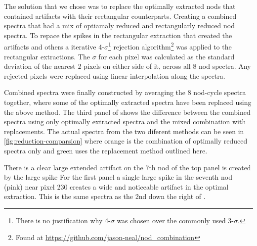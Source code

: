The solution that we chose was to replace the optimally extracted nods that contained artifacts with their rectangular counterparts. Creating a combined spectra that had a mix of optiamaly reduced and rectangularly reduced nod spectra.
To repace the spikes in the rectangular extraction that created the artifacts and others a iterative 4-\(\sigma \)\footnote{There is no justification why 4-\(\sigma\) was chosen over the commonly used 3-\(\sigma\).} rejection algorithm\footnote{Found at \url{https://github.com/jason-neal/nod_combination}} was applied to the rectangular extractions. The \(\sigma\) for each pixel was calculated as the standard deviation of the nearest 2 pixels on either side of it, across all 8 nod spectra. Any rejected pixels were replaced using linear interpolation along the spectra.


Combined spectra were finally constructed by averaging the 8 nod-cycle spectra together, where some of the optimally extracted spectra have been replaced using the above method. The third panel of  shows the difference between the combined spectra using only optimally extracted spectra and the mixed combination with replacements. The actual spectra from the two diferent methods can be seen in \ref{fig:reduction-comparsion} where orange is the combination of optimally reduced spectra only and green uses the replacement method outlined here.

There is a clear large extended artifact on the 7th nod of the top panel is created by the large spike For the first panel a single large spike in the seventh nod (pink) near pixel 230 creates a wide and noticeable artifact in the optimal extraction. This is the same spectra as the 2nd down the right of .

